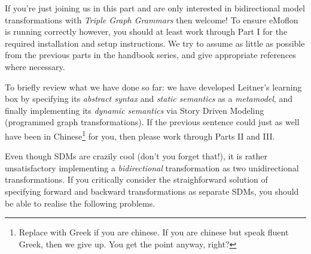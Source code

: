 \genHeader
\label{chap:Learning-Box-to-Dictionary-and-Back-Again}


If you're just joining us in this part and are only interested in bidirectional model transformations with \emph{Triple Graph Grammars} then welcome! To ensure
eMoflon is running correctly however, you should at least work through Part I for the required installation and setup instructions. We try to assume as little
as possible from the previous parts in the handbook series, and give appropriate references where necessary.

To briefly review what we have done so far: we have developed Leitner's learning box by specifying its \emph{abstract syntax} and \emph{static semantics} as a
\emph{metamodel}, and finally implementing its \emph{dynamic semantics} via Story Driven Modeling (programmed graph transformations). If the previous sentence
could just as well have been in Chinese\footnote{Replace with Greek if you are chinese.  If you are chinese but speak fluent Greek, then we give up. You get the
point anyway, right?} for you, then please work through Parts II and III.

Even though SDMs are crazily cool (don't you forget that!), it is rather unsatisfactory implementing a \emph{bidirectional} transformation as two unidirectional
transformations. If you critically consider the straighforward solution of specifying forward and backward transformations as separate SDMs, you should be able
to realise the following problems.

\vspace{-0.5cm}

